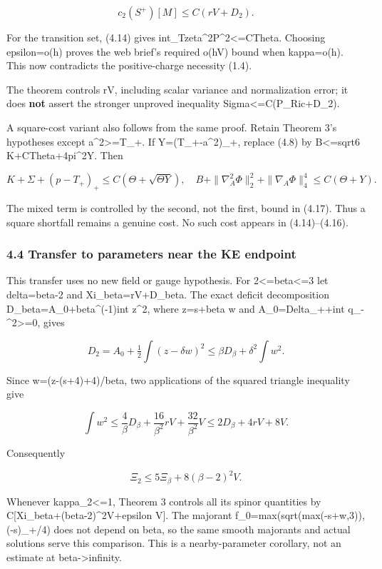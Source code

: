 \documentclass[
  10pt,
]{article}
\begin{document}
\[
                     c_2(S^+)[M]\le C(rV+D_2).       \tag{4.16}
\]

For the transition set, (4.14) gives
int\_T\textbar zeta\textbar\^{}2\textbar P\textbar\^{}2\textless=CTheta.
Choosing epsilon=o(h) proves the web brief's required o(hV) bound when
kappa=o(h). This now contradicts the positive-charge necessity (1.4).

The theorem controls rV, including scalar variance and normalization
error; it does \textbf{not} assert the stronger unproved inequality
Sigma\textless=C(P\_Ric+D\_2).

A square-cost variant also follows from the same proof. Retain Theorem
3's hypotheses except a\^{}2\textgreater=T\_+. If Y=(T\_+-a\^{}2)\_+,
replace (4.8) by B\textless=sqrt6 K+CTheta+4pi\^{}2Y. Then

\[
 K+\Sigma+(p-T_+)_+\le C(\Theta+\sqrt{\Theta Y}),
 \quad
 B+\|\nabla_A^2\Phi\|_2^2+\|\nabla_A\Phi\|_4^4
                   \le C(\Theta+Y).                 \tag{4.17}
\]

The mixed term is controlled by the second, not the first, bound in
(4.17). Thus a square shortfall remains a genuine cost. No such cost
appears in (4.14)--(4.16).

\hypertarget{transfer-to-parameters-near-the-ke-endpoint}{%
\subsubsection{4.4 Transfer to parameters near the KE
endpoint}\label{transfer-to-parameters-near-the-ke-endpoint}}

This transfer uses no new field or gauge hypothesis. For
2\textless=beta\textless=3 let delta=beta-2 and Xi\_beta=rV+D\_beta. The
exact deficit decomposition D\_beta=A\_0+beta\^{}(-1)int z\^{}2, where
z=s+beta w and A\_0=Delta\_++int q\_-\^{}2\textgreater=0, gives

\[
 D_2=A_0+\tfrac12\int(z-\delta w)^2
       \le\beta D_\beta+\delta^2\int w^2.
\]

Since w=(z-(s+4)+4)/beta, two applications of the squared triangle
inequality give

\[
 \int w^2\le\frac4\beta D_\beta+
                \frac{16}{\beta^2}rV+\frac{32}{\beta^2}V
             \le2D_\beta+4rV+8V.
\]

Consequently

\[
                    \Xi_2\le5\Xi_\beta+8(\beta-2)^2V. \tag{4.18}
\]

Whenever kappa\_2\textless=1, Theorem 3 controls all its spinor
quantities by C{[}Xi\_beta+(beta-2)\^{}2V+epsilon V{]}. The majorant
f\_0=max(sqrt(max(-s+w,3)),(-s)\_+/4) does not depend on beta, so the
same smooth majorants and actual solutions serve this comparison. This
is a nearby-parameter corollary, not an estimate at
beta-\textgreater infinity.
\end{document}
